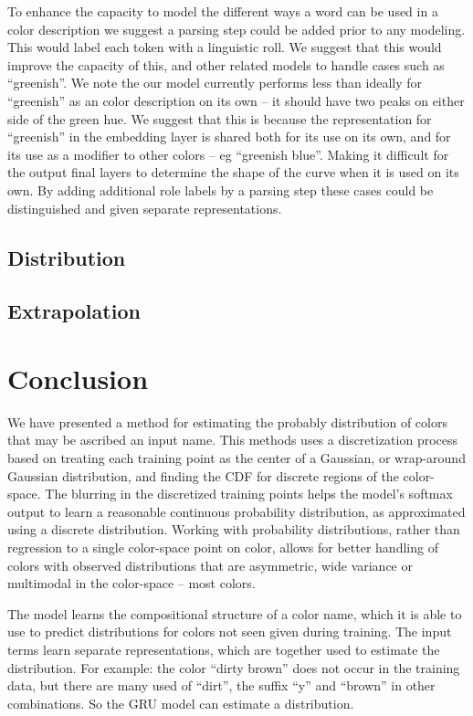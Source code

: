 \documentclass[11pt,letterpaper]{article}
\begin{document}
To enhance the capacity to model the different ways a word can be used in a color description we suggest a parsing step could be added prior to any modeling.
This would label each token with a linguistic roll.
We suggest that this would improve the capacity of this, and other related models to handle cases such as ``greenish''.
We note the our model currently performs less than ideally for ``greenish'' as an color description on its own -- it should have two peaks on either side of the green hue.
We suggest that this is because the representation for ``greenish'' in the embedding layer is shared both for its use on its own, and for its use as a modifier to other colors -- eg ``greenish blue''.
Making it difficult for the output final layers to determine the shape of the curve when it is used on its own.
By adding additional role labels by a parsing step these cases could be distinguished and given separate representations.

\subsection{Distribution}

\subsection{Extrapolation}



\section{Conclusion}
We have presented a method for estimating the probably distribution of colors that may be ascribed an input name.
This methods uses a discretization process based on treating each training point as the center of a Gaussian, or wrap-around Gaussian distribution, and finding the CDF for discrete regions of the color-space.
The blurring in the discretized training points helps the model's softmax output to learn a reasonable continuous probability distribution, as approximated using a discrete distribution.
Working with probability distributions, rather than regression to a single color-space point on color, allows for better handling of colors with observed distributions that are asymmetric, wide variance or multimodal in the color-space -- most colors.

The model learns the compositional structure of a color name, which it is able to use to predict distributions for colors not seen given during training.
The input terms learn separate representations, which are together used to estimate the distribution.
For example: the color ``dirty brown'' does not occur in the training data, but there are many used of ``dirt'', the suffix ``y'' and ``brown'' in other combinations.
So the GRU model can estimate a distribution.
\end{document}
